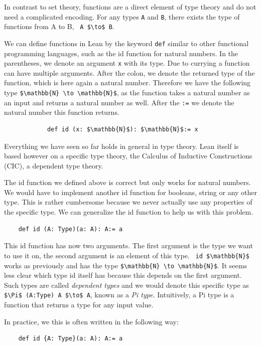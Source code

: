 In contrast to set theory, functions are a direct element of type theory and do not need a complicated encoding. For any types \lstinline|A| and \lstinline|B|, there exists the type of functions from A to B, \lstinline| A $\to$ B|.

We can define functions in Lean by the keyword \lstinline|def| similar to other functional programming languages, such as the id function for natural numbers. In the parentheses, we denote an argument \lstinline|x| with its type. Due to currying a function can have multiple arguments. After the colon, we denote the returned type of the function, which is here again a natural number. Therefore we have the following type \lstinline|$\mathbb{N} \to \mathbb{N}$|, as the function takes a natural number as an input and returns a natural number as well. After the \lstinline|:=| we denote the natural number this function returns. 
\begin{lstlisting}
            def id (x: $\mathbb{N}$): $\mathbb{N}$:= x
\end{lstlisting}

Everything we have seen so far holds in general in type theory. Lean itself is based however on a specific type theory, the Calculus of Inductive Constructions (CIC), a dependent type theory\cite{Lean4, CoC}.

The id function we defined above is correct but only works for natural numbers. We would have to implement another id function for booleans, string or any other type. This is rather cumbersome because we never actually use any properties of the specific type. We can generalize the id function to help us with this problem.

\begin{lstlisting}
    def id (A: Type)(a: A): A:= a
\end{lstlisting}

This id function has now two arguments. The first argument is the type we want to use it on, the second argument is an element of this type. \lstinline| id $\mathbb{N}$| works as previously and has the type \lstinline|$\mathbb{N} \to \mathbb{N}$|. It seems less clear which type id itself has because this depends on the first argument.
Such types are called \textit{dependent types} and we would denote this specific type as \lstinline|$\Pi$ (A:Type) A $\to$ A|, known as a \textit{Pi type}. Intuitively, a Pi type is a function that returns a type for any input value.

In practice, we this is often written in the following way:
\begin{lstlisting}
    def id {A: Type}(a: A): A:= a
\end{lstlisting}

